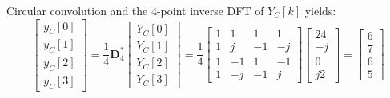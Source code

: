 \documentclass[../../main/main.tex]{subfiles}
\begin{document}
\begin{example}{Circular convolution}{}
    and the \( 4 \)-point inverse DFT of \( Y_{C}[k] \) yields:
    \begin{equation}
        \begin{bmatrix}
            y_{C}[0]    \\
            y_{C}[1]    \\
            y_{C}[2]    \\
            y_{C}[3]
        \end{bmatrix}
        =
        \frac{1}{4} \mathbf{D}^{*}_{4}
        \begin{bmatrix}
            Y_{C}[0]    \\
            Y_{C}[1]    \\
            Y_{C}[2]    \\
            Y_{C}[3]
        \end{bmatrix}
        =
        \frac{1}{4}
        \begin{bmatrix}
            1   &   1   &   1   &   1   \\
            1   &   j   &   -1  &   -j  \\
            1   &   -1  &   1   &   -1  \\
            1   &   -j  &   -1  &   j
        \end{bmatrix}
        \begin{bmatrix}
            24  \\
            -j  \\
            0   \\
            j2
        \end{bmatrix}
        =
        \begin{bmatrix}
            6   \\
            7   \\
            6   \\
            5
        \end{bmatrix}
        \label{eq:L12_S53_1}
    \end{equation}
\end{example}
\end{document}
